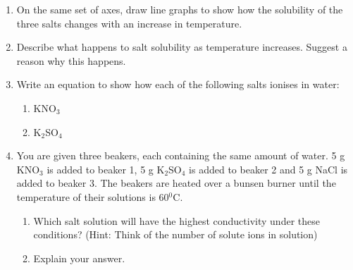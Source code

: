 {\begin{enumerate}
\item{On the same set of axes, draw line graphs to show how the solubility of the three salts changes with an increase in temperature.}
\item{Describe what happens to salt solubility as temperature increases. Suggest a reason why this happens.}
\item{Write an equation to show how each of the following salts ionises in water:}
	\begin{enumerate}
	\item{KNO$_{3}$}
	\item{K$_{2}$SO$_{4}$}
	\end{enumerate}
\item{You are given three beakers, each containing the same amount of water. 5 g KNO$_{3}$ is added to beaker 1, 5 g K$_{2}$SO$_{4}$ is added to beaker 2 and 5 g NaCl is added to beaker 3. The beakers are heated over a bunsen burner until the temperature of their solutions is 60$^{0}$C.}
	\begin{enumerate}
	\item{Which salt solution will have the highest conductivity under these conditions? (Hint: Think of the number of solute ions in solution) }
	\item{Explain your answer.}
	\end{enumerate}
\end{enumerate}
\practiceinfo
}

